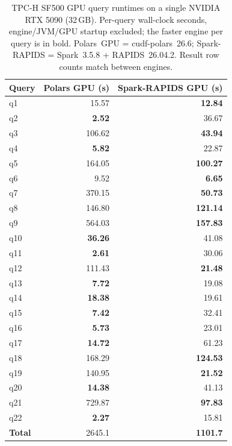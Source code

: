 \begin{table}[t]
  \centering
  \caption{TPC-H SF500 GPU query runtimes on a single NVIDIA RTX 5090 (32\,GB).
    Per-query wall-clock seconds, engine/JVM/GPU startup excluded; the faster
    engine per query is in bold. Polars~GPU = cudf-polars~26.6; Spark-RAPIDS =
    Spark~3.5.8 + RAPIDS~26.04.2. Result row counts match between engines.}
  \label{tab:tpch-sf500-gpu}
  \begin{tabular}{l r r}
    \toprule
    Query & Polars GPU (s) & Spark-RAPIDS GPU (s) \\
    \midrule
    q1 & 15.57 & \textbf{12.84} \\
    q2 & \textbf{2.52} & 36.67 \\
    q3 & 106.62 & \textbf{43.94} \\
    q4 & \textbf{5.82} & 22.87 \\
    q5 & 164.05 & \textbf{100.27} \\
    q6 & 9.52 & \textbf{6.65} \\
    q7 & 370.15 & \textbf{50.73} \\
    q8 & 146.80 & \textbf{121.14} \\
    q9 & 564.03 & \textbf{157.83} \\
    q10 & \textbf{36.26} & 41.08 \\
    q11 & \textbf{2.61} & 30.06 \\
    q12 & 111.43 & \textbf{21.48} \\
    q13 & \textbf{7.72} & 19.08 \\
    q14 & \textbf{18.38} & 19.61 \\
    q15 & \textbf{7.42} & 32.41 \\
    q16 & \textbf{5.73} & 23.01 \\
    q17 & \textbf{14.72} & 61.23 \\
    q18 & 168.29 & \textbf{124.53} \\
    q19 & 140.95 & \textbf{21.52} \\
    q20 & \textbf{14.38} & 41.13 \\
    q21 & 729.87 & \textbf{97.83} \\
    q22 & \textbf{2.27} & 15.81 \\
    \midrule
    \textbf{Total} & 2645.1 & \textbf{1101.7} \\
    \bottomrule
  \end{tabular}
\end{table}
